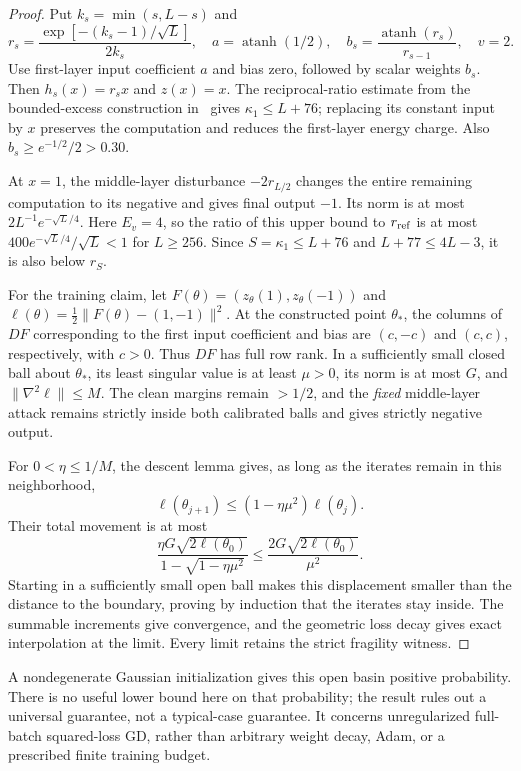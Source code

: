\begin{proof}
Put $k_s=\min(s,L-s)$ and
\[
 r_s=\frac{\exp[-(k_s-1)/\sqrt L]}{2k_s},\quad
 a=\operatorname{atanh}(1/2),\quad
 b_s=\frac{\operatorname{atanh}(r_s)}{r_{s-1}},\quad v=2.
\]
Use first-layer input coefficient $a$ and bias zero, followed by scalar
weights $b_s$. Then $h_s(x)=r_sx$ and $z(x)=x$.
The reciprocal-ratio estimate from the bounded-excess construction in~\cite{previous} gives $\kappa_1\le L+76$; replacing its constant input by
$x$ preserves the computation and reduces the first-layer energy charge.
Also $b_s\ge e^{-1/2}/2>0.30$.

At $x=1$, the middle-layer disturbance $-2r_{L/2}$ changes the entire
remaining computation to its negative and gives final output $-1$.
Its norm is at most $2L^{-1}e^{-\sqrt L/4}$. Here $E_v=4$, so the ratio
of this upper bound to $r_{\rm ref}$ is at most
$400e^{-\sqrt L/4}/\sqrt L<1$ for $L\ge256$.
Since $S=\kappa_1\le L+76$ and $L+77\le4L-3$, it is also below $r_S$.

For the training claim, let $F(\theta)=(z_\theta(1),z_\theta(-1))$ and
$\ell(\theta)=\frac12\|F(\theta)-(1,-1)\|^2$.
At the constructed point $\theta_*$, the columns of $DF$ corresponding
to the first input coefficient and bias are $(c,-c)$ and $(c,c)$,
respectively, with $c>0$. Thus $DF$ has full row rank.
In a sufficiently small closed ball about $\theta_*$, its least singular
value is at least $\mu>0$, its norm is at most $G$, and
$\|\nabla^2\ell\|\le M$. The clean margins remain $>1/2$, and the
\emph{fixed} middle-layer attack remains strictly inside both calibrated
balls and gives strictly negative output.

For $0<\eta\le1/M$, the descent lemma gives, as long as the iterates
remain in this neighborhood,
\[
 \ell(\theta_{j+1})\le(1-\eta\mu^2)\ell(\theta_j).
\]
Their total movement is at most
\[
 \frac{\eta G\sqrt{2\ell(\theta_0)}}{1-\sqrt{1-\eta\mu^2}}
 \le \frac{2G\sqrt{2\ell(\theta_0)}}{\mu^2}.
\]
Starting in a sufficiently small open ball makes this displacement smaller
than the distance to the boundary, proving by induction that the iterates
stay inside. The summable increments give convergence, and the geometric
loss decay gives exact interpolation at the limit. Every limit retains the
strict fragility witness.
\end{proof}

A nondegenerate Gaussian initialization gives this open basin positive
probability. There is no useful lower bound here on that probability;
the result rules out a universal guarantee, not a typical-case guarantee.
It concerns unregularized full-batch squared-loss GD, rather than arbitrary
weight decay, Adam, or a prescribed finite training budget.

